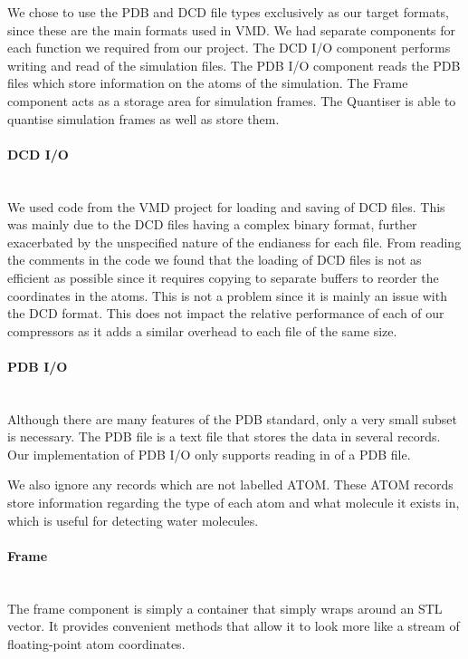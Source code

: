 \documentclass[a4paper,11pt]{report}
\begin{document}
We chose to use the PDB and DCD file types exclusively as our target formats, since these are the main formats used in VMD. We had separate components for each function we required from our project. The DCD I/O component performs writing and read of the simulation files. The PDB I/O component reads the PDB files which store information on the atoms of the simulation. The Frame component acts as a storage area for simulation frames. The Quantiser is able to quantise simulation frames as well as store them.

\paragraph{DCD I/O}
\ \\
We used code from the VMD project for loading and saving of DCD files. This was mainly due to the DCD files having a complex binary format, further exacerbated by the unspecified nature of the endianess for each file. From reading the comments in the code we found that the loading of DCD files is not as efficient as possible since it requires copying to separate buffers to reorder the coordinates in the atoms. This is not a problem since it is mainly an issue with the DCD format. This does not impact the relative performance of each of our compressors as it adds a similar overhead to each file of the same size.

\paragraph{PDB I/O}
\ \\
Although there are many features of the PDB standard, only a very small subset is necessary. The PDB file is a text file that stores the data in several records. Our implementation of PDB I/O only supports reading in of a PDB file. 

We also ignore any records which are not labelled ATOM. These ATOM records store information regarding the type of each atom and what molecule it exists in, which is useful for detecting water molecules.

\paragraph{Frame}
\ \\
The frame component is simply a container that simply wraps around an STL vector. It provides convenient methods that allow it to look more like a stream of floating-point atom coordinates.
\end{document}
